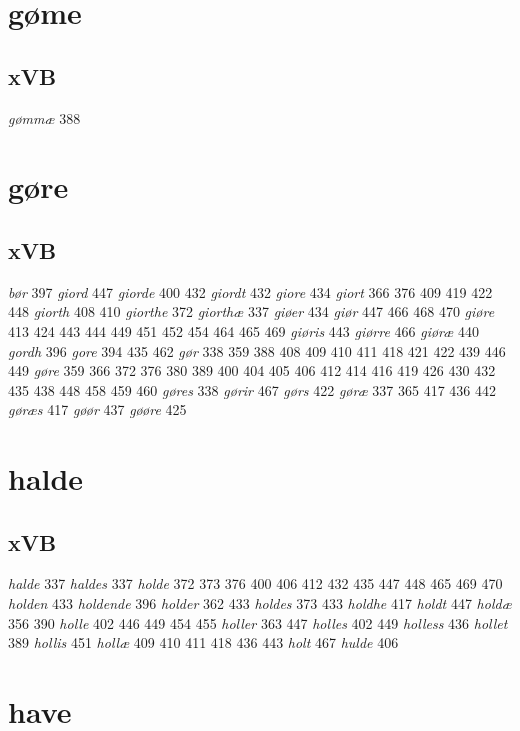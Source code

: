 \documentclass[a4paper,twocolumn]{article}
\begin{document}
\section{gøme}
\label{sec:org535b930}
\subsection{xVB}
\label{sec:org6a9cc60}
\emph{gømmæ} 388 
\section{gøre}
\label{sec:org3d9681b}
\subsection{xVB}
\label{sec:org7771622}
\emph{bør} 397 \emph{giord} 447 \emph{giorde} 400 432 \emph{giordt} 432 \emph{giore} 434 \emph{giort} 366 376 409 419 422 448 \emph{giorth} 408 410 \emph{giorthe} 372 \emph{giorthæ} 337 \emph{giøer} 434 \emph{giør} 447 466 468 470 \emph{giøre} 413 424 443 444 449 451 452 454 464 465 469 \emph{giøris} 443 \emph{giørre} 466 \emph{giøræ} 440 \emph{gordh} 396 \emph{gore} 394 435 462 \emph{gør} 338 359 388 408 409 410 411 418 421 422 439 446 449 \emph{gøre} 359 366 372 376 380 389 400 404 405 406 412 414 416 419 426 430 432 435 438 448 458 459 460 \emph{gøres} 338 \emph{gørir} 467 \emph{gørs} 422 \emph{gøræ} 337 365 417 436 442 \emph{gøræs} 417 \emph{gøør} 437 \emph{gøøre} 425 
\section{halde}
\label{sec:orgcc60b66}
\subsection{xVB}
\label{sec:orgdb86982}
\emph{halde} 337 \emph{haldes} 337 \emph{holde} 372 373 376 400 406 412 432 435 447 448 465 469 470 \emph{holden} 433 \emph{holdende} 396 \emph{holder} 362 433 \emph{holdes} 373 433 \emph{holdhe} 417 \emph{holdt} 447 \emph{holdæ} 356 390 \emph{holle} 402 446 449 454 455 \emph{holler} 363 447 \emph{holles} 402 449 \emph{holless} 436 \emph{hollet} 389 \emph{hollis} 451 \emph{hollæ} 409 410 411 418 436 443 \emph{holt} 467 \emph{hulde} 406 
\section{have}
\label{sec:orgb1d95b9}
\end{document}
